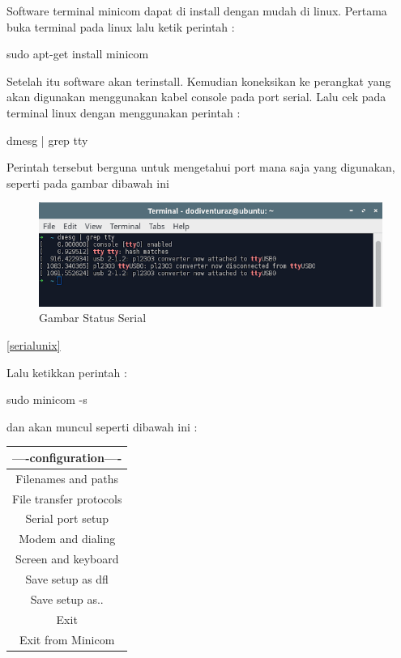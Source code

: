 	Software terminal minicom dapat di install dengan mudah di linux. Pertama buka terminal pada linux lalu ketik perintah :

	sudo apt-get install minicom

	Setelah itu software akan terinstall. Kemudian koneksikan ke perangkat yang akan digunakan menggunakan kabel console pada port serial. Lalu cek pada terminal linux dengan menggunakan perintah :

	dmesg | grep tty
	
	Perintah tersebut berguna untuk mengetahui port mana saja yang digunakan, seperti pada gambar dibawah ini
	
	\begin{figure} [ht]
	\centerline{\includegraphics[width=1\textwidth]{figures/serialunix.png}}
	\caption{Gambar Status Serial}
	\label{statusserial}
	\end{figure}
	
	\ref{serialunix}
	
	Lalu ketikkan perintah :
	
	sudo minicom -s
	
	dan akan muncul seperti dibawah ini :
	
	\begin{table}[H]
		\begin{tabular}{|c|}
			\hline
			----configuration----\\
			\hline
			Filenames and paths\\
			\hline
			File transfer protocols\\
			\hline
			Serial port setup\\
			\hline
			Modem and dialing\\
			\hline
			Screen and keyboard\\
			\hline
			Save setup as dfl\\
			\hline
			Save setup as..\\
			\hline
			Exit\\
			\hline
			Exit from Minicom\\
		\end{tabular}
	\end{table}
	
